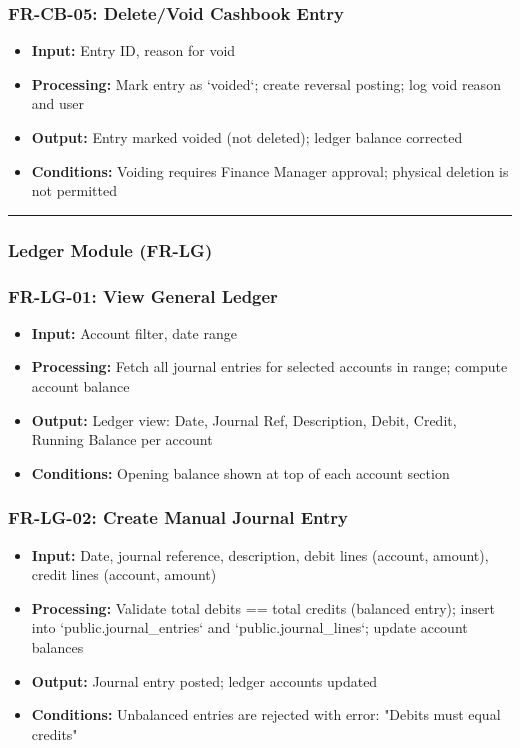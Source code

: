 \documentclass[journal, a4paper, onecolumn, 12pt]{IEEEtran}
\begin{document}
\subsubsection{FR-CB-05: Delete/Void Cashbook Entry}
\begin{itemize}[leftmargin=*]
\item \textbf{Input:} Entry ID, reason for void
\item \textbf{Processing:} Mark entry as `voided`; create reversal posting; log void reason and user
\item \textbf{Output:} Entry marked voided (not deleted); ledger balance corrected
\item \textbf{Conditions:} Voiding requires Finance Manager approval; physical deletion is not permitted
\end{itemize}

\vspace{1em}\hrule\vspace{1em}

\subsubsection{Ledger Module (FR-LG)}

\subsubsection{FR-LG-01: View General Ledger}
\begin{itemize}[leftmargin=*]
\item \textbf{Input:} Account filter, date range
\item \textbf{Processing:} Fetch all journal entries for selected accounts in range; compute account balance
\item \textbf{Output:} Ledger view: Date, Journal Ref, Description, Debit, Credit, Running Balance per account
\item \textbf{Conditions:} Opening balance shown at top of each account section
\end{itemize}

\subsubsection{FR-LG-02: Create Manual Journal Entry}
\begin{itemize}[leftmargin=*]
\item \textbf{Input:} Date, journal reference, description, debit lines (account, amount), credit lines (account, amount)
\item \textbf{Processing:} Validate total debits == total credits (balanced entry); insert into `public.journal\_entries` and `public.journal\_lines`; update account balances
\item \textbf{Output:} Journal entry posted; ledger accounts updated
\item \textbf{Conditions:} Unbalanced entries are rejected with error: "Debits must equal credits"
\end{itemize}
\end{document}
